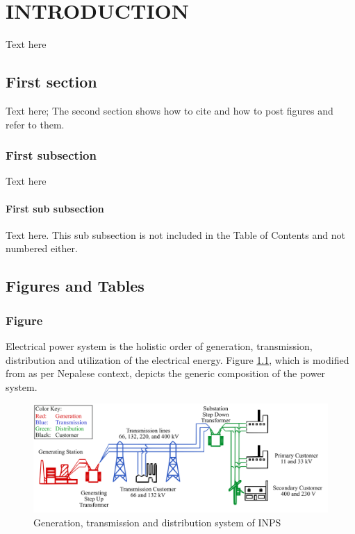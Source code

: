 \chapter{ INTRODUCTION} %

\label{chapter1} %


\newcommand{\keyword}[1]{\textbf{#1}}
\newcommand{\tabhead}[1]{\textbf{#1}}
\newcommand{\code}[1]{\texttt{#1}}
\newcommand{\file}[1]{\texttt{\bfseries#1}}
\newcommand{\option}[1]{\texttt{\itshape#1}}

Text here

\section{First section}\label{first-section}
Text here; The second section shows how to cite and how to post figures and refer to them.
\subsection{First subsection}
Text here
\subsubsection{First sub subsection}
Text here.
This sub subsection is not included in the Table of Contents and not numbered either.

\section{Figures and Tables}\label{power-sys-def}

\subsection{Figure}
Electrical power system is the holistic order of generation, transmission, distribution and utilization of the electrical energy. Figure \ref{F1-1}, which is modified from \cite{nerc_grid_concept} as per Nepalese context, depicts the generic composition of the power system.
 
\begin{figure}[ht]
    \centering
    \includegraphics[width=1\textwidth]{Figures/1/Electricity_grid_simple-Nepal.png}
    \caption{Generation, transmission and distribution system of INPS}
    \label{F1-1}
\end{figure}

